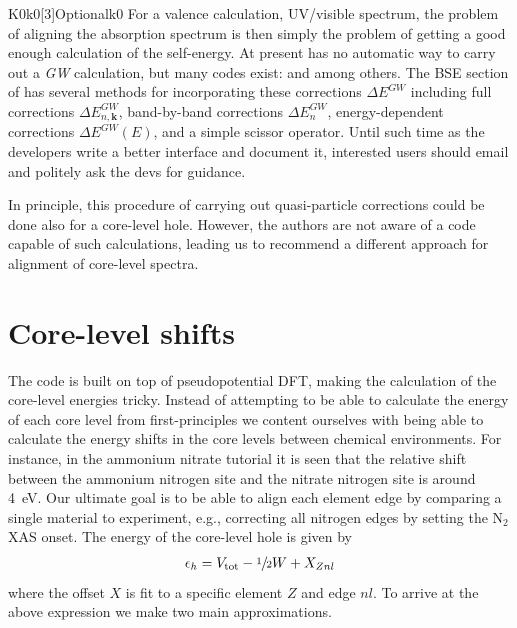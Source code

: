 \documentclass[11pt]{report}
\begin{document}
\begin{Card}{K0}{k0[3]}{Optional}{k0}
For a valence calculation, UV/visible spectrum, the problem of aligning the absorption spectrum is then simply the problem of getting a good enough calculation of the self-energy. 
At present  has no automatic way to carry out a {\it GW} calculation, but many codes exist:  and  among others. 
The BSE section of  has several methods for incorporating these corrections $\Delta E^{\textit{GW}}$ including full corrections $\Delta E^{\textit{GW}}_{n,\mathbf{k}}$, band-by-band corrections 
$\Delta E^{\textit{GW}}_{n}$, energy-dependent corrections $\Delta E^{\textit{GW}}(E)$, and a simple scissor operator.
Until such time as the developers write a better interface and document it, interested users should email and politely ask the devs for guidance. 

In principle, this procedure of carrying out quasi-particle corrections could be done also for a core-level hole. 
However, the authors are not aware of a code capable of such calculations, leading us to recommend a different approach for alignment of core-level spectra.

\section{Core-level shifts}

The  code is built on top of pseudopotential DFT, making the calculation of the core-level energies tricky. 
Instead of attempting to be able to calculate the energy of each core level from first-principles we content ourselves with being able to calculate the energy shifts in the core levels between chemical environments.
For instance, in the ammonium nitrate tutorial it is seen that the relative shift between the ammonium nitrogen site and the nitrate nitrogen site is around 4~eV. 
Our ultimate goal is to be able to align each element edge by comparing a single material to experiment, e.g., correcting all nitrogen edges by setting the N$_2$ XAS onset. 
The energy of the core-level hole is given by
\begin{align}
\epsilon_h = V_{\rm{tot}} - \sfrac{1}{2} W + X_{Znl}
\end{align}
where the offset $X$ is fit to a specific element $Z$ and edge $nl$. 
To arrive at the above expression we make two main approximations.


\end{Card}
\end{document}
